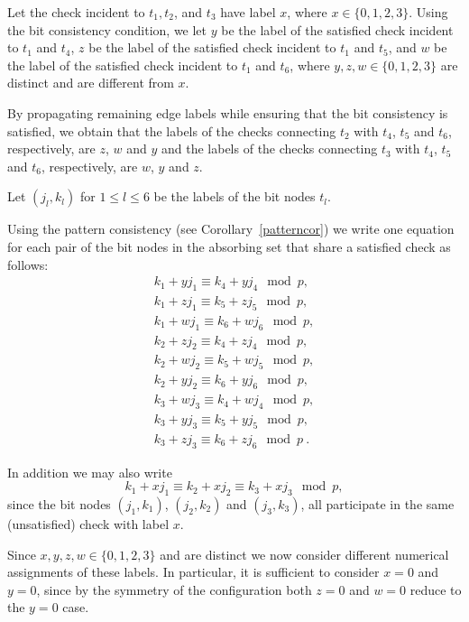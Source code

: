 Let the check incident to $t_1,t_2$, and $t_3$ have label $x$, where
$x \in \{0,1,2,3\}$. Using the bit consistency condition, we let $y$
be the label of the satisfied check incident to $t_1$ and $t_4$, $z$
be the label of the satisfied check incident to $t_1$ and $t_5$, and
$w$ be the label of the satisfied check incident to $t_1$ and $t_6$,
where $y,z,w \in \{0,1,2,3\}$ are distinct and are different from
$x$.

By propagating remaining edge labels while ensuring that the bit
consistency is satisfied, we obtain that the labels of the checks
connecting $t_2$ with $t_4$, $t_5$  and $t_6$, respectively, are
$z$, $w$ and $y$ and the labels of the checks connecting $t_3$ with
$t_4$, $t_5$  and $t_6$, respectively, are $w$, $y$ and $z$.

Let $(j_l,k_l)$ for $1 \leq l \leq 6$ be the labels of the bit nodes
$t_l$.

Using the pattern consistency (see Corollary~\ref{patterncor}) we
write one equation for each pair of the bit nodes in the absorbing
set that share a satisfied check as follows:
\begin{equation}\label{eq1e}\begin{array}{cccc}
k_1+yj_1 \equiv k_4+yj_4 \mod p,\\
k_1+zj_1 \equiv k_5+zj_5 \mod p,\\
k_1+wj_1 \equiv k_6+wj_6 \mod p,\\
k_2+zj_2 \equiv k_4+zj_4 \mod p,\\
k_2+wj_2 \equiv k_5+wj_5 \mod p,\\
k_2+yj_2 \equiv k_6+yj_6 \mod p,\\
k_3+wj_3 \equiv k_4+wj_4 \mod p,\\
k_3+yj_3 \equiv k_5+yj_5 \mod p,\\
k_3+zj_3 \equiv k_6+zj_6 \mod p~.
\end{array}\end{equation}

In addition we may also write
\begin{equation}\label{eq2e}
k_1+xj_1 \equiv k_2+xj_2 \equiv k_3+xj_3 \mod p,
\end{equation}
since the bit nodes $(j_1,k_1)$, $(j_2,k_2)$ and $(j_3,k_3)$, all
participate in the same (unsatisfied) check with label $x$.

Since $x,y,z,w \in \{0,1,2,3\}$ and are distinct we now consider
different numerical assignments of these labels. In particular, it
is sufficient to consider $x=0$ and $y=0$, since by the symmetry of
the configuration both $z=0$ and $w=0$ reduce to the $y=0$ case.

